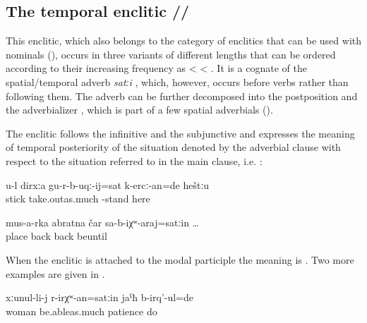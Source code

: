 
\subsection{The temporal enclitic \slash{}\slash{} }
\label{sec:enclitic =satin}

This enclitic, which also belongs to the category of enclitics that can be used with nominals (), occurs in three variants of different lengths that can be ordered according to their increasing frequency as   <  < . It is a cognate of the spatial/temporal adverb \textit{satːi} , which, however, occurs before verbs rather than following them. The adverb can be further decomposed into the postposition   and the adverbializer , which is part of a few spatial adverbials ().

The enclitic follows the infinitive and the subjunctive and expresses the meaning of temporal posteriority of the situation denoted by the adverbial clause with respect to the situation referred to in the main clause, i.e. :
%
\begin{exe}
	\ex	\label{ex:Until you take your stick out, you have to stand there}
	\gll	u-l	dirxːa	gu-r-b-uqː-ij=sat	k-ercː-an=de	heštːu\\
			stick	take.outas.much -stand	here\\
	\glt	{}

	\ex	\label{ex:Before (the turtle) came back from that place}
	\gll	mus-a-rka	abratna	čar	sa-b-iχʷ-araj=satːin	\ldots\\
		place		back	back	beuntil\\
	\glt	{}
\end{exe}

When the enclitic is attached to the modal participle the meaning is  . Two more examples are given in .
%
\begin{exe}
	\ex	\label{ex:‎‎‎The woman was patient as long as she could}
	\gll	xːunul-li-j	r-irχʷ-an=satːin	jaˁħ	b-irq'-ul=de\\
		woman	be.ableas.much	patience	do\\
	\glt	{}
\end{exe}

